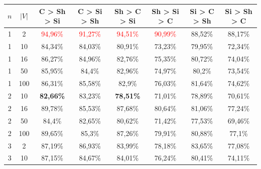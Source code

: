 \begin{table}[ht]
    \centering
    \begin{tabular}{cc|c|c|c|c|c|c}
        \toprule
        $n$ & $|V|$ & \textbf{C > Sh > Si}     & \textbf{C > Si > Sh}     & \textbf{Sh > C > Si}     & \textbf{Sh > Si > C}     & \textbf{Si > C > Sh} & \textbf{Si > Sh > C} \\\midrule
        {1} & {2}   & \textcolor{red}{94,96\%} & \textcolor{red}{91,27\%} & \textcolor{red}{94,51\%} & \textcolor{red}{90,99\%} & {88,52\%}            & {88,17\%}            \\
        {1} & {10}  & {84,34\%}                & {84,03\%}                & {80,91\%}                & {73,23\%}                & {79,95\%}            & {72,34\%}            \\
        {1} & {16}  & {86,27\%}                & {84,96\%}                & {82,76\%}                & {75,35\%}                & {80,72\%}            & {74,04\%}            \\
        {1} & {50}  & {85,95\%}                & {84,4\%}                 & {82,96\%}                & {74,97\%}                & {80,2\%}             & {73,54\%}            \\
        {1} & {100} & {86,31\%}                & {85,58\%}                & {82,9\%}                 & {76,03\%}                & {81,64\%}            & {74,62\%}            \\
        {2} & {10}  & \textbf{82,66\%}         & {83,23\%}                & \textbf{78,51\%}         & {71,01\%}                & {78,89\%}            & {70,61\%}            \\
        {2} & {16}  & {89,78\%}                & {85,53\%}                & {87,68\%}                & {80,64\%}                & {81,06\%}            & {77,24\%}            \\
        {2} & {50}  & {84,4\%}                 & {82,65\%}                & {80,62\%}                & {71,42\%}                & {77,53\%}            & {69,46\%}            \\
        {2} & {100} & {89,65\%}                & {85,3\%}                 & {87,26\%}                & {79,91\%}                & {80,88\%}            & {77,1\%}             \\
        {3} & {2}   & {87,19\%}                & {86,93\%}                & {83,99\%}                & {78,18\%}                & {83,65\%}            & {77,08\%}            \\
        {3} & {10}  & {87,15\%}                & {84,67\%}                & {84,01\%}                & {76,24\%}                & {80,41\%}            & {74,11\%}            \\

\end{tabular}
\end{table}
